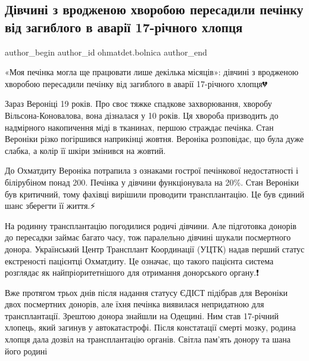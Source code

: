  
 
 
 
 
 
\subsection{Дівчині з вродженою хворобою пересадили печінку від загиблого в аварії 17-річного хлопця}
\label{sec:23_11_2022.fb.ohmatdet.bolnica.1.pechinka}
 
\ifcmt
 author_begin
   author_id ohmatdet.bolnica
 author_end
\fi

«Моя печінка могла ще працювати лише декілька місяців»: дівчині з вродженою
хворобою пересадили печінку від загиблого в аварії 17-річного хлопця💔

Зараз Вероніці 19 років. Про своє тяжке спадкове захворювання, хворобу
Вільсона-Коновалова, вона дізналася у 10 років. Ця хвороба призводить до
надмірного накопичення міді в тканинах, першою страждає печінка. Стан Вероніки
різко погіршився наприкінці жовтня. Вероніка розповідає, що була дуже слабка, а
колір її шкіри змінився на жовтий.🙏🏻

До Охматдиту Вероніка потрапила з ознаками гострої печінкової недостатності і
білірубіном понад 200. Печінка у дівчини функціонувала на 20\%. Стан Вероніки
був критичний, тому фахівці вирішили проводити трансплантацію. Це був єдиний
шанс зберегти її життя.⚡️

На родинну трансплантацію погодилися родичі дівчини. Але підготовка донорів до
пересадки займає багато часу, тож паралельно дівчині шукали посмертного донора.
Український Центр Трансплант Координації (УЦТК) надав перший статус екстреності
пацієнтці Охматдиту. Це означає, що такого пацієнта система розглядає як
найпріоритетнішого для отримання донорського органу.❗️

Вже протягом трьох днів після надання статусу ЄДІСТ підібрав для Вероніки двох
посмертних донорів, але їхня печінка виявилася непридатною для трансплантації.
Зрештою донора знайшли на Одещині. Ним став 17-річний хлопець, який загинув у
автокатастрофі. Після констатації смерті мозку, родина хлопця дала дозвіл на
трансплантацію органів. Світла пам’ять донору та шана його родині🙏🏻

